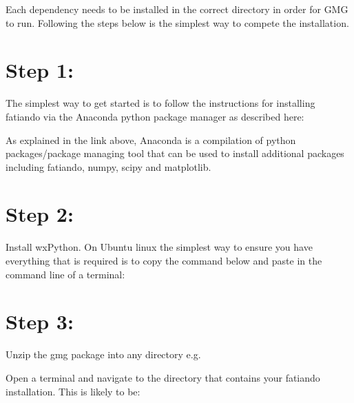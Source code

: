 \documentclass[a4paper,12pt,english]{sphinxmanual}
\begin{document}
Each dependency needs to be installed in the correct directory in order for GMG to run. Following the steps below is
the simplest way to compete the installation.


\chapter{Step 1:}
\label{\detokenize{installation:step-1}}
The simplest way to get started is to follow the instructions for installing fatiando via the Anaconda
python package manager as described here:


As explained in the link above, Anaconda is a compilation of python packages/package
managing tool that can be used to install additional packages including fatiando, numpy, scipy and matplotlib.


\chapter{Step 2:}
\label{\detokenize{installation:step-2}}
Install wxPython. On Ubuntu linux the simplest way to ensure you have everything that is required
is to copy the command below and paste in the command line of a terminal:

%
\begin{sphinxVerbatim}[commandchars=\\\{\}]
       
\end{sphinxVerbatim}


\chapter{Step 3:}
\label{\detokenize{installation:step-3}}
Unzip the gmg package into any directory e.g. 

Open a terminal and navigate to the directory that contains your fatiando installation.
This is likely to be:

%
\begin{sphinxVerbatim}[commandchars=\\\{\}]
 
\end{sphinxVerbatim}
\end{document}
